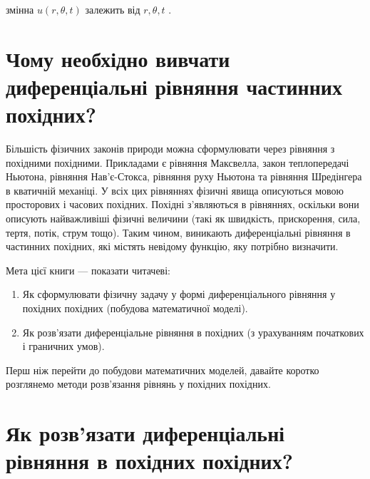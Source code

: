 \documentclass[
  ukrainian,
]{article}
\begin{document}
змінна \(u(r, \theta, t)\) залежить від \(r, \theta, t\) .

\section{Чому необхідно вивчати диференціальні рівняння частинних
похідних?}\label{ux447ux43eux43cux443-ux43dux435ux43eux431ux445ux456ux434ux43dux43e-ux432ux438ux432ux447ux430ux442ux438-ux434ux438ux444ux435ux440ux435ux43dux446ux456ux430ux43bux44cux43dux456-ux440ux456ux432ux43dux44fux43dux43dux44f-ux447ux430ux441ux442ux438ux43dux43dux438ux445-ux43fux43eux445ux456ux434ux43dux438ux445}

Більшість фізичних законів природи можна сформулювати через рівняння з
похідними похідними. Прикладами є рівняння Максвелла, закон
теплопередачі Ньютона, рівняння Нав'є-Стокса, рівняння руху Ньютона та
рівняння Шредінгера в кватичній механіці. У всіх цих рівняннях фізичні
явища описуються мовою просторових і часових похідних. Похідні
з'являються в рівняннях, оскільки вони описують найважливіші фізичні
величини (такі як швидкість, прискорення, сила, тертя, потік, струм
тощо). Таким чином, виникають диференціальні рівняння в частинних
похідних, які містять невідому функцію, яку потрібно визначити.

Мета цієї книги --- показати читачеві:

\begin{enumerate}
\def\labelenumi{\arabic{enumi}.}
\item
  Як сформулювати фізичну задачу у формі диференціального рівняння у
  похідних похідних (побудова математичної моделі).
\item
  Як розв'язати диференціальне рівняння в похідних (з урахуванням
  початкових і граничних умов).
\end{enumerate}

Перш ніж перейти до побудови математичних моделей, давайте коротко
розглянемо методи розв'язання рівнянь у похідних похідних.

\section{Як розв'язати диференціальні рівняння в похідних
похідних?}\label{ux44fux43a-ux440ux43eux437ux432ux44fux437ux430ux442ux438-ux434ux438ux444ux435ux440ux435ux43dux446ux456ux430ux43bux44cux43dux456-ux440ux456ux432ux43dux44fux43dux43dux44f-ux432-ux43fux43eux445ux456ux434ux43dux438ux445-ux43fux43eux445ux456ux434ux43dux438ux445}
\end{document}
